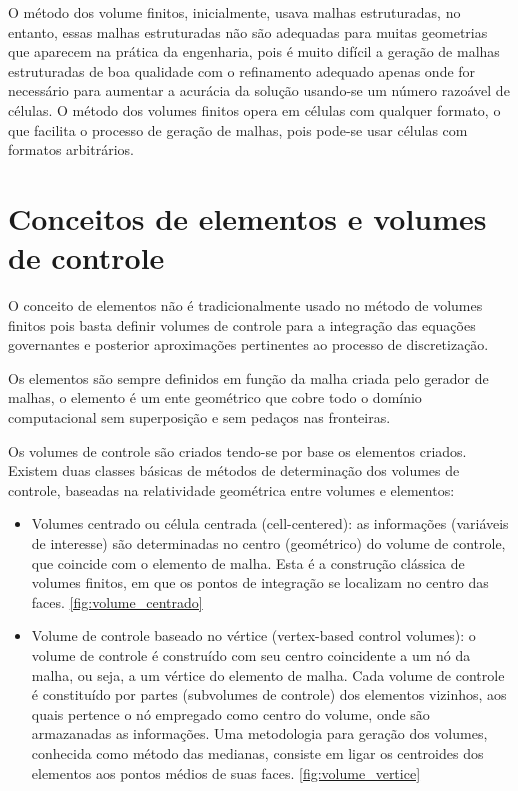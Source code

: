 O método dos volume finitos, inicialmente, usava malhas estruturadas, no entanto, essas malhas estruturadas não são adequadas para muitas geometrias que aparecem na prática da engenharia, pois é muito difícil a geração de malhas estruturadas de boa qualidade com o refinamento adequado apenas onde for necessário para aumentar a acurácia da solução usando-se um número razoável de células. O método dos volumes finitos opera em células com qualquer formato, o que facilita o processo de geração de malhas, pois pode-se usar células com formatos arbitrários. \cite{doi:10.1080/10407791003685155}

\section{Conceitos de elementos e volumes de controle}

O conceito de elementos não é tradicionalmente usado no método de volumes finitos pois basta definir volumes de controle para a integração das equações governantes e posterior aproximações pertinentes ao processo de discretização. \cite{Versteeg2007}

Os elementos são sempre definidos em função da malha criada pelo gerador de malhas, o elemento é um ente geométrico que cobre todo o domínio computacional sem superposição e sem pedaços nas fronteiras.

Os volumes de controle são criados tendo-se por base os elementos criados. Existem duas classes básicas de métodos de determinação dos volumes de controle, baseadas na relatividade geométrica entre volumes e elementos:

\begin{itemize}
    \item Volumes centrado ou célula centrada (cell-centered): as informações (variáveis de interesse) são determinadas no centro (geométrico) do volume de controle, que coincide com o elemento de malha. Esta é a construção clássica de volumes finitos, em que os pontos de integração se localizam no centro das faces. \ref{fig:volume_centrado}
    \item Volume de controle baseado no vértice (vertex-based control volumes): o volume de controle é construído com seu centro coincidente a um nó da malha, ou seja, a um vértice do elemento de malha. Cada volume de controle é constituído por partes (subvolumes de controle) dos elementos vizinhos, aos quais pertence o nó empregado como centro do volume, onde são armazanadas as informações. Uma metodologia para geração dos volumes, conhecida como método das medianas, consiste em ligar os centroides dos elementos aos pontos médios de suas faces. \ref{fig:volume_vertice}
\end{itemize}

